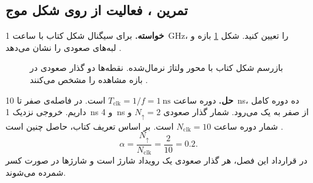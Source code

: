 \subsection{تمرین ، فعالیت از روی شکل موج}
\label{sec:assignment-power-waveform}

\textbf{خواسته.}
برای سیگنال شکل  کتاب با ساعت \qty{1}{\giga\hertz}،
 را تعیین کنید. شکل \ref{fig:assignment-power-waveform}
بازه و لبه‌های صعودی را نشان می‌دهد
\cite[تمرین ، صفحه ۲۰۹]{weste}.

\begin{figure}[htbp]
  \centering
  
  \caption{بازرسم شکل  کتاب با محور ولتاژ نرمال‌شده.
    نقطه‌ها دو گذار صعودی در بازه مشاهده را مشخص می‌کنند \cite{weste}.}
  \label{fig:assignment-power-waveform}
\end{figure}

\textbf{حل.}
دوره ساعت \(T_{\mathrm{clk}}=1/f=\qty{1}{\nano\second}\) است.
در فاصله‌ی صفر تا \qty{10}{\nano\second}، ده دوره کامل داریم.
خروجی نزدیک \qty{1}{\nano\second} و \qty{4}{\nano\second} از
صفر به یک می‌رود. شمار گذار صعودی \(N_{\uparrow}=2\) و شمار
دوره ساعت \(N_{\mathrm{clk}}=10\) است. بر اساس تعریف کتاب، حاصل چنین است
\cite[بخش ، صفحه ۱۸۴]{weste}.
\[
  \alpha=\frac{N_{\uparrow}}{N_{\mathrm{clk}}}=\frac{2}{10}=0.2.
\]
در قرارداد این فصل، هر گذار صعودی یک رویداد شارژ است و شارژها
در صورت کسر شمرده می‌شوند.
